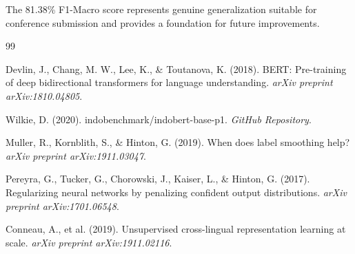 \documentclass[10pt,journal]{IEEEtran}
\begin{document}
The 81.38\% F1-Macro score represents genuine generalization suitable for conference submission and provides a foundation for future improvements.


\begin{thebibliography}{99}

Devlin, J., Chang, M. W., Lee, K., \& Toutanova, K. (2018).
\newblock BERT: Pre-training of deep bidirectional transformers for language understanding.
\newblock \emph{arXiv preprint arXiv:1810.04805}.

Wilkie, D. (2020).
\newblock indobenchmark/indobert-base-p1.
\newblock \emph{GitHub Repository}.

Muller, R., Kornblith, S., \& Hinton, G. (2019).
\newblock When does label smoothing help?
\newblock \emph{arXiv preprint arXiv:1911.03047}.

Pereyra, G., Tucker, G., Chorowski, J., Kaiser, L., \& Hinton, G. (2017).
\newblock Regularizing neural networks by penalizing confident output distributions.
\newblock \emph{arXiv preprint arXiv:1701.06548}.

Conneau, A., et al. (2019).
\newblock Unsupervised cross-lingual representation learning at scale.
\newblock \emph{arXiv preprint arXiv:1911.02116}.

\end{thebibliography}
\end{document}
